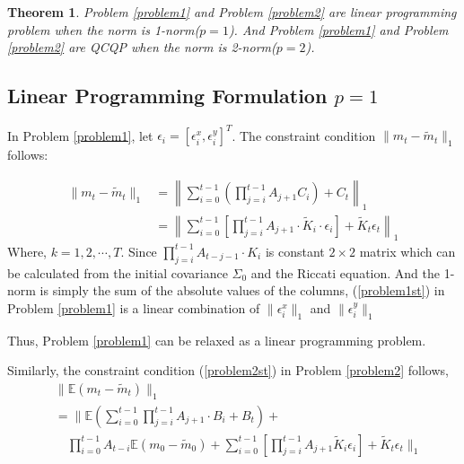 \documentclass[letterpaper, 10 pt, conference]{ieeeconf}  %
\newtheorem{theorem}{Theorem}
\begin{document}
\begin{theorem}
Problem \ref{problem1} and Problem \ref{problem2} are linear programming problem when 
the norm is 1-norm($p=1$). And Problem \ref{problem1} and Problem \ref{problem2} are QCQP when the norm is 2-norm($p=2$).
\end{theorem}

\subsection{Linear Programming Formulation  $p=1$}
\label{p_equal_1}

 
In Problem \ref{problem1}, let $\epsilon_i=[\epsilon_i^x, \epsilon_i^y]^T$. The constraint condition $\lVert m_t-\tilde{m}_t\lVert_1 $ follows:

\begin{equation} \label{replacePro1}
\begin{split}
\lVert m_t-\tilde{m}_t\lVert_1  &=\left\lVert\sum_{i=0}^{t-1} \left(\prod_{j=i}^{t-1}A_{j+1}  C_i\right) + C_t \right\lVert_1\\
&= \left\lVert \sum_{i=0}^{t-1} \left[ \prod_{j=i}^{t-1}A_{j+1}\cdot \tilde{K}_i  \cdot \epsilon_i\right] + \tilde{K}_t \epsilon_t \right\lVert_1
\end{split}
\end{equation}
Where, $k=1,2,\cdots,T$. Since $\prod_{j=i}^{t-1}A_{t-j-1}\cdot K_i$ is constant $2 \times 2$ matrix which can be calculated from the initial covariance $\Sigma_0$ and the Riccati equation. 
And the 1-norm is simply the sum of the absolute values of the columns, (\ref{problem1st}) in Problem \ref{problem1} is a linear combination of  $\lVert \epsilon_i^x\lVert_1 $ and $\lVert \epsilon_i^y\lVert_1 $

Thus, Problem \ref{problem1} can be relaxed as a linear programming problem.


Similarly, the constraint condition (\ref{problem2st}) in Problem \ref{problem2} follows, 
\begin{equation} 
\begin{split}
& \lVert \mathbb{E}\left(m_t-\tilde{m}_t\right)\lVert_1   \\
&= \Bigg\lVert \mathbb{E} \left(\sum_{i=0}^{t-1}  \prod_{j=i}^{t-1}A_{j+1}\cdot B_i    +  B_t \right) + \\
&\quad\prod_{i=0}^{t-1}A_{t-i} \mathbb{E} (m_0  - \tilde{m}_0) +\sum_{i=0}^{t-1} \left[ \prod_{j=i}^{t-1}A_{j+1} \tilde{K}_i   \epsilon_i\right] +  \tilde{K}_t\epsilon_t \Bigg\lVert_1
\end{split}
\end{equation}
\end{document}
